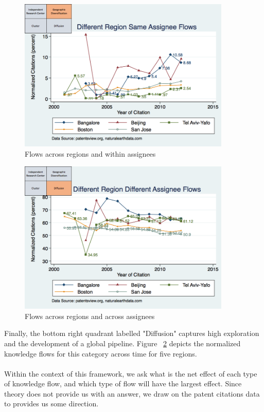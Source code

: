 \documentclass[10pt,letterpaper]{article}
\begin{document}
\begin{figure}[h!]
\begin{centering}
  \includegraphics[width=0.90\textwidth]{SMSDiffRegionSameAssigneeFlows}
  \caption{Flows across regions and within assignees}
  \label{fig:SMSDiffRegionSameAssigneeFlows}
\end{centering}
\end{figure}

\begin{figure}[h!]
\begin{centering}
  \includegraphics[width=0.90\textwidth]{SMSDiffRegionDiffAssigneeFlows}
  \caption{Flows across regions and across assignees}
  \label{fig:SMSDiffRegionDiffAssigneeFlows}
\end{centering}
\end{figure}

Finally, the bottom right quadrant labelled "Diffusion" captures high exploration and the development of a global pipeline. Figure ~\ref{fig:SMSDiffRegionDiffAssigneeFlows} depicts the normalized knowledge flows for this category across time for five regions.
\\\\
Within the context of this framework, we ask what is the net effect of each type of knowledge flow, and which type of flow will have the largest effect. Since theory does not provide us with an answer, we draw on the patent citations data to provides us some direction. 
\end{document}
